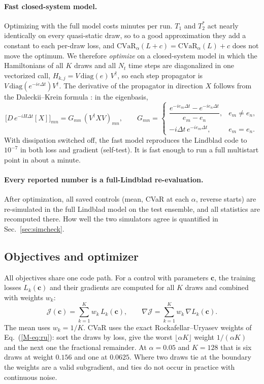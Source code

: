 \documentclass[aps,pra,onecolumn,notitlepage,superscriptaddress,nofootinbib,floatfix]{revtex4-2}
\newcommand{\cvar}{\mathrm{CVaR}}
\begin{document}
\paragraph*{Fast closed-system model.} Optimizing with the full model costs
minutes per run. $T_1$ and $T_2^*$ act nearly identically on every
quasi-static draw, so to a good approximation they add a constant to each
per-draw loss, and $\cvar_\alpha(L+c)=\cvar_\alpha(L)+c$ does not move the
optimum. We therefore \emph{optimize} on a closed-system model in which the
Hamiltonians of all $K$ draws and all $N_t$ time steps are diagonalized in one
vectorized call, $H_{k,j}=V\,\mathrm{diag}(e)\,V^\dagger$, so each step
propagator is $V\,\mathrm{diag}(e^{-ie\Delta t})V^\dagger$. The derivative of
the propagator in direction $X$ follows from the Daleckii--Krein formula
\cite{Higham2008}: in the eigenbasis,
\begin{equation}
\big[D\,e^{-iH\Delta t}[X]\big]_{mn}=G_{mn}\,(V^\dagger XV)_{mn},\qquad
G_{mn}=\begin{cases}\dfrac{e^{-ie_m\Delta t}-e^{-ie_n\Delta t}}{e_m-e_n}, & e_m\ne e_n,\\[6pt]
-i\Delta t\,e^{-ie_m\Delta t}, & e_m=e_n.\end{cases}
\label{eq:dk}
\end{equation}
With dissipation switched off, the fast model reproduces the Lindblad code to
$10^{-7}$ in both loss and gradient (self-test). It is fast enough to run a full multistart point in about a minute.

\paragraph*{Every reported number is a full-Lindblad re-evaluation.} After
optimization, all saved controls (mean, CVaR at each $\alpha$, reverse starts)
are re-simulated in the full Lindblad model on the test ensemble, and all
statistics are recomputed there. How well the two simulators agree is
quantified in Sec.~\ref{sec:simcheck}.


\subsection{Objectives and optimizer}
All objectives share one code path. For a control with parameters
$\mathbf c$, the training losses $L_k(\mathbf c)$ and their gradients are
computed for all $K$ draws and combined with weights $w_k$:
\begin{equation}
\mathcal J(\mathbf c)=\sum_{k=1}^{K}w_k\,L_k(\mathbf c),\qquad
\nabla\mathcal J=\sum_{k=1}^{K}w_k\,\nabla L_k(\mathbf c).
\label{eq:objective}
\end{equation}
The mean uses $w_k=1/K$. CVaR uses the exact Rockafellar--Uryasev weights of
Eq.~(\ref{M-eq:ru}): sort the draws by loss, give the worst
$\lfloor\alpha K\rfloor$ weight $1/(\alpha K)$ and the next one the fractional
remainder. At $\alpha=0.05$ and $K=128$ that is six draws at weight $0.156$ and
one at $0.0625$. Where two draws tie at the boundary the weights are a valid
subgradient, and ties do not occur in practice with continuous noise.
\end{document}
